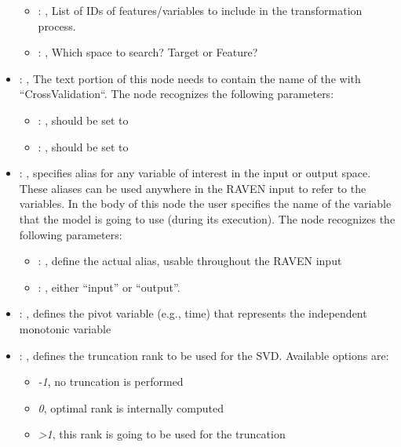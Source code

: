 \begin{itemize}
\begin{itemize}
        \item {}: , 
          List of IDs of features/variables to include in the transformation process.

        \item {}: , 
          Which space to search? Target or Feature?
      \end{itemize}

    \item {}: , 
      The text portion of this node needs to contain the name of the  with
               ``CrossValidation``.
      The  node recognizes the following parameters:
        \begin{itemize}
          \item {}: , 
            should be set to 
          \item {}: , 
            should be set to 
      \end{itemize}

    \item {}: , 
      specifies alias for         any variable of interest in the input or output space. These
      aliases can be used anywhere in the RAVEN input to         refer to the variables. In the body
      of this node the user specifies the name of the variable that the model is going to use
      (during its execution).
      The  node recognizes the following parameters:
        \begin{itemize}
          \item {}: , 
            define the actual alias, usable throughout the RAVEN input
          \item {}: , 
            either ``input'' or ``output''.
      \end{itemize}

    \item {}: , 
      defines the pivot variable (e.g., time) that represents the
      independent monotonic variable

    \item {}: , 
      defines the truncation rank to be used for the SVD.
      Available options are:                                                  \begin{itemize}
      \item \textit{-1}, no truncation is performed
      \item \textit{0}, optimal rank is internally computed
      \item \textit{>1}, this rank is going to be used for the truncation
      \end{itemize}


\end{itemize}
